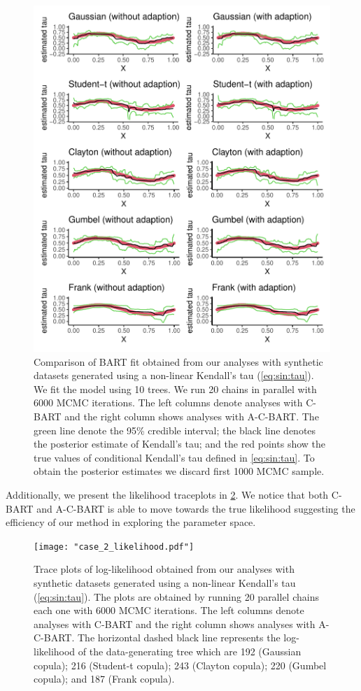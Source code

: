 \documentclass{amsart}
\begin{document}
\begin{figure}
	\centering
	\includegraphics[width = 0.95\linewidth]{"case_2_pred.pdf"}
	\caption{Comparison of BART fit obtained from our analyses with synthetic datasets generated using a non-linear Kendall's tau (\cref{eq:sin:tau}). We fit the model using 10 trees. We run 20 chains in parallel with 6000 MCMC iterations. The left columns denote analyses with C-BART and the right column shows analyses with A-C-BART. The green line denote the 95\% credible interval; the black line denotes the posterior estimate of Kendall's tau; and the red points show the true values of conditional Kendall's tau defined in \cref{eq:sin:tau}. To obtain the posterior estimates we discard first 1000 MCMC sample.}
	\label{fig:trace:pred:ex2}
\end{figure}

Additionally, we present the likelihood traceplots in \cref{fig:trace:like:ex2}. We notice that both C-BART and A-C-BART is able to move towards the true likelihood suggesting the efficiency of our method in exploring the parameter space.

\begin{figure}
	\centering
	\texttt{[image: "case\_2\_likelihood.pdf"]}
	\caption{Trace plots of log-likelihood obtained from our analyses with synthetic datasets generated using a non-linear Kendall's tau (\cref{eq:sin:tau}). The plots are obtained by running 20 parallel chains each one with 6000 MCMC iterations. The left columns denote analyses with C-BART and the right column shows analyses with A-C-BART. The horizontal dashed black line represents the log-likelihood of the data-generating tree which are 192 (Gaussian copula); 216 (Student-t copula); 243 (Clayton copula); 220 (Gumbel copula); and 187 (Frank copula).}
	\label{fig:trace:like:ex2}
\end{figure}
\end{document}
